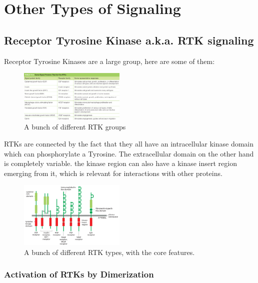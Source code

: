 \documentclass[../main.tex]{subfiles}
\begin{document}
\section{Other Types of Signaling}
\subsection{Receptor Tyrosine Kinase a.k.a. RTK signaling}

Receptor Tyrosine Kinases are a large group, here are some of them:
\begin{figure}[H]
	\centering
	\includegraphics[width=0.45\textwidth]{RTk_ex}
	\caption{A bunch of different RTK groups}
\end{figure}

RTKs are connected by the fact that they all have an intracellular kinase domain which can phosphorylate a Tyrosine. The extracellular domain on the other hand is completely variable. the kinase region can also have a kinase insert region emerging from it, which is relevant for interactions with other proteins.

\begin{figure}[H]
	\centering
	\includegraphics[width=0.45\textwidth]{RTk_types}
	\caption{A bunch of different RTK types, with the core features.}
\end{figure}

\subsubsection{Activation of RTKs by Dimerization}
\end{document}
